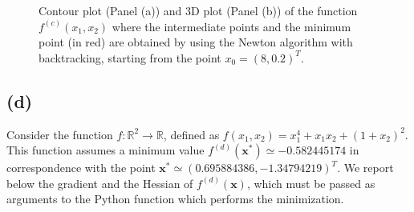\documentclass[a4paper,11pt]{article}
\begin{document}
	\begin{figure}[htb]
		\centering
		 \quad
		\caption{Contour plot (Panel (a)) and 3D plot (Panel (b)) of the function $f^{(c)}(x_{1},x_{2})$ where the intermediate points and the minimum point (in red) are obtained by using the Newton algorithm with backtracking, starting from the point $x_{0}=(8,0.2)^{T}$.}
		\label{Fig:func_c_x0_2_backtracking}
	\end{figure}
	
	\subsection{(d)}
	Consider the function $f:\mathbb{R}^{2} \rightarrow  \mathbb{R}$, defined as $f(x_{1},x_{2}) = x_{1}^{4} + x_{1}x_{2} + (1+x_{2})^{2}$. This function assumes a minimum value $f^{(d)}(\textbf{x}^*)\simeq -0.582445174$ in correspondence with the point $\textbf{x}^{*}\simeq (0.695884386, -1.34794219)^{T}$. We report below the gradient and the Hessian of $f^{(d)}(\textbf{x})$, which must be passed as arguments to the Python function which performs the minimization.
	
\end{document}
